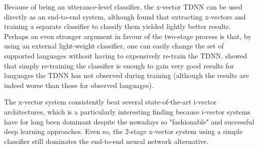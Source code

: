 \documentclass[bsc,frontabs,twoside,singlespacing,parskip,deptreport]{infthesis}
\begin{document}
{{    %
    Because of being an utterance-level classifier, the x-vector TDNN can be used directly as an end-to-end system, although \citeauthor{Snyder_et_al_2018} found that extracting x-vectors and training a separate classifier to classify them yielded lightly better results. Perhaps an even stronger argument in favour of the two-stage process is that, by using an external light-weight classifier, one can easily change the set of supported languages without having to expensively re-train the TDNN. \citeauthor{Snyder_et_al_2018} showed that simply re-training the classifier is enough to gain very good results for languages the TDNN has not observed during training (although the results are indeed worse than those for observed languages).

    The x-vector system consistently beat several state-of-the-art i-vector architectures, which is a particularly interesting finding because i-vector systems have for long been dominant despite the nowadays so "fashionable" and successful deep learning approaches. Even so, the 2-stage x-vector system using a simple classifier still dominates the end-to-end neural network alternative.
  }

}
\end{document}
